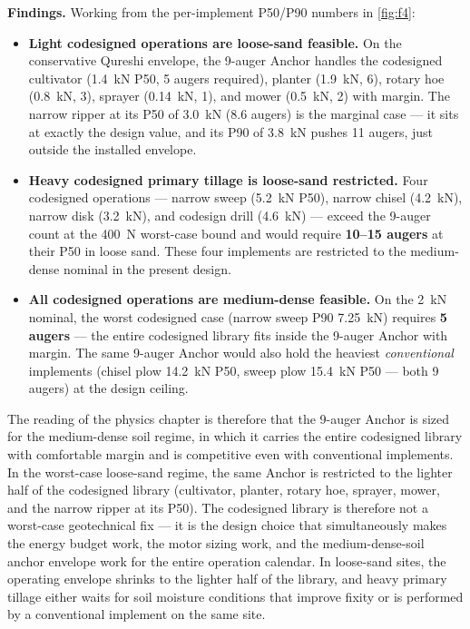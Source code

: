 \documentclass[11pt,a4paper]{article}
\begin{document}
\textbf{Findings.} Working from the per-implement P50/P90 numbers in \cref{fig:f4}:
\begin{itemize}[leftmargin=1.6em,itemsep=0.15em]
    \item \textbf{Light codesigned operations are loose-sand feasible.} On the conservative Qureshi envelope, the 9-auger Anchor handles the codesigned cultivator (\SI{1.4}{\kilo\newton} P50, 5 augers required), planter (\SI{1.9}{\kilo\newton}, 6), rotary hoe (\SI{0.8}{\kilo\newton}, 3), sprayer (\SI{0.14}{\kilo\newton}, 1), and mower (\SI{0.5}{\kilo\newton}, 2) with margin. The narrow ripper at its P50 of \SI{3.0}{\kilo\newton} (8.6 augers) is the marginal case --- it sits at exactly the design value, and its P90 of \SI{3.8}{\kilo\newton} pushes 11 augers, just outside the installed envelope.
    \item \textbf{Heavy codesigned primary tillage is loose-sand restricted.} Four codesigned operations --- narrow sweep (\SI{5.2}{\kilo\newton} P50), narrow chisel (\SI{4.2}{\kilo\newton}), narrow disk (\SI{3.2}{\kilo\newton}), and codesign drill (\SI{4.6}{\kilo\newton}) --- exceed the 9-auger count at the \SI{400}{\newton} worst-case bound and would require \textbf{10--15 augers} at their P50 in loose sand. These four implements are restricted to the medium-dense nominal in the present design.
    \item \textbf{All codesigned operations are medium-dense feasible.} On the \SI{2}{\kilo\newton} nominal, the worst codesigned case (narrow sweep P90 \SI{7.25}{\kilo\newton}) requires \textbf{5 augers} --- the entire codesigned library fits inside the 9-auger Anchor with margin. The same 9-auger Anchor would also hold the heaviest \emph{conventional} implements (chisel plow \SI{14.2}{\kilo\newton} P50, sweep plow \SI{15.4}{\kilo\newton} P50 --- both 9 augers) at the design ceiling.
\end{itemize}

The reading of the physics chapter is therefore that the 9-auger Anchor is sized for the medium-dense soil regime, in which it carries the entire codesigned library with comfortable margin and is competitive even with conventional implements. In the worst-case loose-sand regime, the same Anchor is restricted to the lighter half of the codesigned library (cultivator, planter, rotary hoe, sprayer, mower, and the narrow ripper at its P50). The codesigned library is therefore not a worst-case geotechnical fix --- it is the design choice that simultaneously makes the energy budget work, the motor sizing work, and the medium-dense-soil anchor envelope work for the entire operation calendar. In loose-sand sites, the operating envelope shrinks to the lighter half of the library, and heavy primary tillage either waits for soil moisture conditions that improve fixity or is performed by a conventional implement on the same site.
\end{document}

